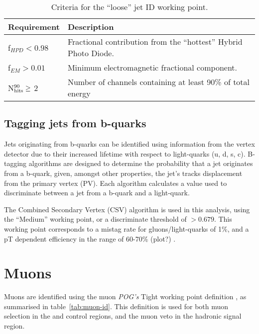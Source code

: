 \begin{table}[!ht]
  \caption{Criteria for the ``loose'' jet ID working point.\label{tab:jet_id_loose}}
  \footnotesize
  \begin{center}
    \begin{tabular}{ll}
      \hline
      \hline
      Requirement                & Description                                                      \\
      \hline
      f$_{HPD} < 0.98$           & Fractional contribution from the ``hottest'' Hybrid Photo Diode. \\
      f$_{EM} > 0.01$            & Minimum electromagnetic fractional component.                    \\
      N$^{90}_{\rm hits} \geq$ 2 & Number of channels containing at least 90\% of total energy      \\
      \hline
      \hline
    \end{tabular}
  \end{center}
\end{table}


\subsection{Tagging jets from b-quarks}

Jets originating from b-quarks can be identified using information from the 
vertex detector due to their increased lifetime with respect to light-quarks (u,
d, s, c). 
B-tagging algorithms are designed to determine the probability that a jet 
originates from a b-quark, given, amongst other properties, the jet's tracks
displacement from the primary 
vertex (PV). Each algorithm
calculates a value used to discriminate between a jet from a b-quark and a
light-quark.

The Combined Secondary Vertex (CSV) algorithm \cite{CMS-PAS-BTV-12-001} is used in this analysis,
using the ``Medium'' working point, or a discriminate threshold of $>0.679$. This 
working point corresponds to a mistag rate for gluons/light-quarks of 1\%, and a
pT dependent efficiency in the range of 60-70\% (plot?) \cite{CMS-PAS-BTV-12-001}.


\section{Muons}  %
\label{sec:objects_muons}
Muons are identified using the muon \emph{POG's} Tight working point definition
\cite{ref:muon-id}, as 
summarised in table~\ref{tab:muon-id}. This definition is used for both muon 
selection in the \mj and \mmj control regions, and the muon veto in the hadronic
signal region.

